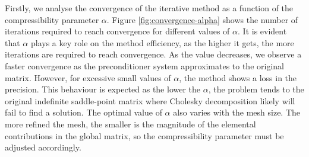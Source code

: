 \documentclass{wccm2024}
\begin{document}
Firstly, we analyse the convergence of the iterative method as a function of the compressibility parameter $\alpha$. Figure \ref{fig:convergence-alpha} shows the number of iterations required to reach convergence for different values of $\alpha$. It is evident that $\alpha$ plays a key role on the method efficiency, as the higher it gets, the more iterations are required to reach convergence. As the value decreases, we observe a faster convergence as the preconditioner system approximates to the original matrix. However, for excessive small values of $\alpha$, the method shows a loss in the precision. This behaviour is expected as the lower the $\alpha$, the problem tends to the original indefinite saddle-point matrix where Cholesky decomposition likely will fail to find a solution. The optimal value of $\alpha$ also varies with the mesh size. The more refined the mesh, the smaller is the magnitude of the elemental contributions in the global matrix, so the compressibility parameter must be adjusted accordingly.
\end{document}
